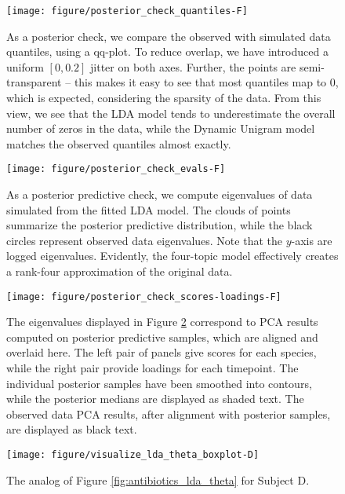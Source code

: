\documentclass[oupdraft]{bio}
\begin{document}
\begin{figure}[!p]
  \centering
  \texttt{[image: figure/posterior\_check\_quantiles-F]}
  \caption{As a posterior check, we compare the observed with simulated
    data quantiles, using a qq-plot. To reduce overlap, we have introduced a
    uniform $\left[0, 0.2\right]$ jitter on both axes. Further, the points are
    semi-transparent -- this makes it easy to see that most quantiles map to 0,
    which is expected, considering the sparsity of the data. From this view, we
    see that the LDA model tends to underestimate the overall number of zeros in
    the data, while the Dynamic Unigram model matches the observed quantiles
    almost exactly. \label{fig:antibiotics_posterior_quantiles} }
\end{figure}

\begin{figure}[!p]
  \centering
  \texttt{[image: figure/posterior\_check\_evals-F]}
  \caption{As a posterior predictive check, we compute eigenvalues of data
    simulated from the fitted LDA model. The clouds of points summarize the
    posterior predictive distribution, while the black circles represent
    observed data eigenvalues. Note that the $y$-axis are logged eigenvalues.
    Evidently, the four-topic model effectively creates a rank-four
    approximation of the original data.
    \label{fig:antibiotics_posterior_evals}}
\end{figure}

\begin{figure}[!p]
  \centering
  \texttt{[image: figure/posterior\_check\_scores-loadings-F]}
  \caption{The eigenvalues displayed in Figure
    \ref{fig:antibiotics_posterior_evals} correspond to PCA results computed on
    posterior predictive samples, which are aligned and overlaid here. The left
    pair of panels give scores for each species, while the right pair provide
    loadings for each timepoint. The individual posterior samples have been
    smoothed into contours, while the posterior medians are displayed as shaded
    text. The observed data PCA results, after alignment with posterior samples,
    are displayed as black text. \label{fig:antibiotics_posterior_pca} }
\end{figure}

\begin{figure}[!p]
  \centering\texttt{[image: figure/visualize\_lda\_theta\_boxplot-D]}
  \caption{The analog of Figure \ref{fig:antibiotics_lda_theta} for Subject
    D. \label{fig:antibiotics_lda_theta_D}}
\end{figure}
\end{document}
